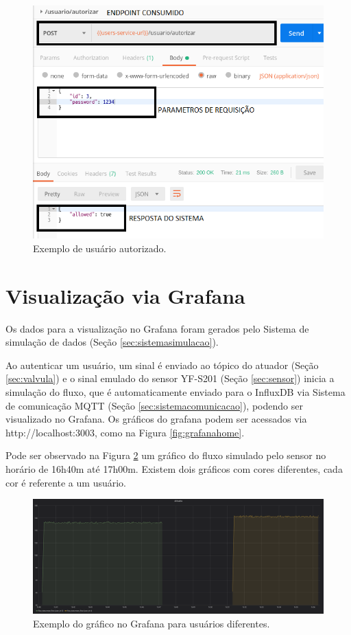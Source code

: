 \begin{figure}[htbp]
	\centering
	\includegraphics[width=0.7\linewidth]{figuras/postman/allowedtrue.png}
	\caption{Exemplo de usuário autorizado.}
	\label{fig:allowedtrue}
\end{figure}

\section{Visualização via Grafana}

Os dados para a visualização no Grafana foram gerados pelo Sistema de simulação de dados (Seção \ref{sec:sistemasimulacao}).

Ao autenticar um usuário, um sinal é enviado ao tópico do atuador (Seção \ref{sec:valvula}) e o sinal emulado do sensor YF-S201 (Seção \ref{sec:sensor}) inicia a simulação do fluxo, que é automaticamente enviado para o InfluxDB via Sistema de comunicação MQTT (Seção \ref{sec:sistemacomunicacao}), podendo ser visualizado no Grafana. Os gráficos do grafana podem ser acessados via http://localhost:3003, como na Figura \ref{fig:grafanahome}.

Pode ser observado na Figura \ref{fig:grafana-graph} um gráfico do fluxo simulado pelo sensor no horário de 16h40m até 17h00m. Existem dois gráficos com cores diferentes, cada cor é referente a um usuário.

\begin{figure}[htbp]
	\centering
	\includegraphics[width=1\linewidth]{figuras/grafanagraph.png}
	\caption{Exemplo do gráfico no Grafana para usuários diferentes.}
	\label{fig:grafana-graph}
\end{figure}

